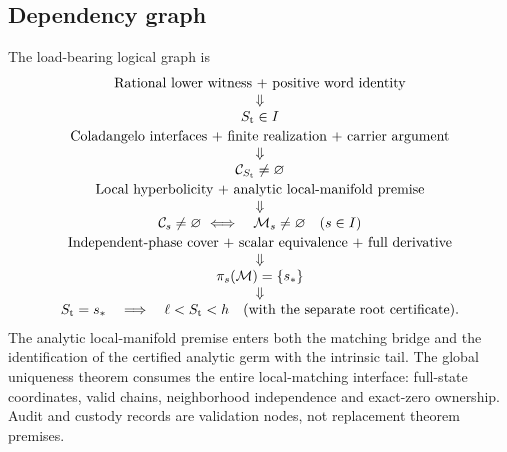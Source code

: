 \subsection{Dependency graph}
The load-bearing logical graph is
\[
\begin{array}{c}
 \text{Rational lower witness + positive word identity}\\
 \Downarrow\\
 S_{\mathrm t}\in I\\[2pt]
 \text{Coladangelo interfaces + finite realization + carrier argument}\\
 \Downarrow\\
 \mathcal C_{S_{\mathrm t}}\ne\varnothing\\[2pt]
 \text{Local hyperbolicity + analytic local-manifold premise}\\
 \Downarrow\\
 \mathcal C_s\ne\varnothing\ \Longleftrightarrow\quad
                      \mathcal M_s\ne\varnothing\quad(s\in I)\\[2pt]
 \text{Independent-phase cover + scalar equivalence + full derivative}\\
 \Downarrow\\
 \pi_s(\mathcal M)=\{s_*\}\\
 \Downarrow\\
 S_{\mathrm t}=s_*\quad\Longrightarrow\quad\ell<S_{\mathrm t}<h
 \quad\text{(with the separate root certificate).}
\end{array}
\]
The analytic local-manifold premise enters both the matching bridge
and the identification of the certified analytic germ with the
intrinsic tail. The global uniqueness theorem consumes the entire
local-matching interface: full-state coordinates, valid chains,
neighborhood independence and exact-zero ownership. Audit and custody
records are validation nodes, not replacement theorem premises.

